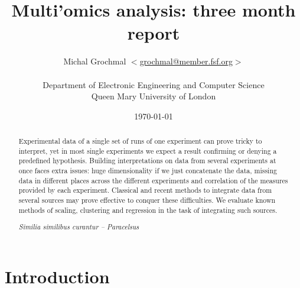 \documentclass[11pt,a4paper,twoside,openright]{report}
\title{Multi'omics analysis: three month report}
\author{Michal Grochmal
  $<$\href{mailto:grochmal@member.fsf.org}{grochmal@member.fsf.org}$>$\\
  \\
  Department of Electronic Engineering and Computer Science\\
  Queen Mary University of London
}
\date{\today}
\begin{document}
\maketitle

\newpage
\null
\thispagestyle{empty}
\newpage


\pagestyle{fancy}
\lhead{}
\rhead{}

\begin{abstract}
Experimental data of a single set of runs of one experiment can prove tricky to
interpret, yet in most single experiments we expect a result confirming or
denying a predefined hypothesis.  Building interpretations on data from several
experiments at once faces extra issues: huge dimensionality if we just
concatenate the data, missing data in different places across the different
experiments and correlation of the measures provided by each experiment.
Classical and recent methods to integrate data from several sources may prove
effective to conquer these difficulties.  We evaluate known methods of scaling,
clustering and regression in the task of integrating such sources.
\begin{flushright}
\emph{Similia similibus curantur -- Paracelsus}
\end{flushright}
\end{abstract}

\newpage
\null
\thispagestyle{empty}
\newpage

\newpage
\setcounter{page}{1}

\clearpage{\pagestyle{empty}\cleardoublepage}
\chapter{Introduction}
\end{document}
